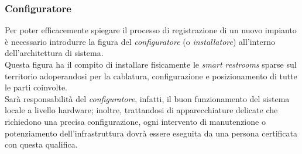 \documentclass[12pt]{article}
\begin{document}
\subsubsection{Configuratore} Per poter efficacemente spiegare il processo di registrazione di un nuovo impianto è necessario introdurre la figura del \textit{configuratore} (o \textit{installatore}) all'interno dell'architettura di sistema.\\
Questa figura ha il compito di installare fisicamente le \textit{smart restrooms} sparse sul territorio adoperandosi per la cablatura, configurazione e posizionamento di tutte le parti coinvolte.\\
Sarà responsabilità del \textit{configuratore}, infatti, il buon funzionamento del sistema locale a livello hardware; inoltre, trattandosi di apparecchiature delicate che richiedono una precisa configurazione, ogni intervento di manutenzione o potenziamento dell'infrastruttura dovrà essere eseguita da una persona certificata con questa qualifica. 
\end{document}

